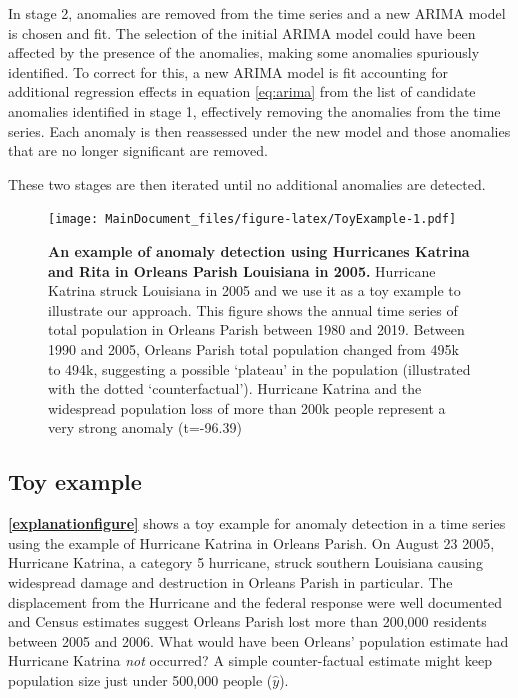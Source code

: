 \documentclass[12pt]{article}
\begin{document}
In stage 2, anomalies are removed from the time series and a new ARIMA
model is chosen and fit. The selection of the initial ARIMA model could
have been affected by the presence of the anomalies, making some
anomalies spuriously identified. To correct for this, a new ARIMA model
is fit accounting for additional regression effects in equation
\ref{eq:arima} from the list of candidate anomalies identified in stage
1, effectively removing the anomalies from the time series. Each anomaly
is then reassessed under the new model and those anomalies that are no
longer significant are removed.

These two stages are then iterated until no additional anomalies are
detected.

\begin{figure}
\centering
\texttt{[image: MainDocument\_files/figure-latex/ToyExample-1.pdf]}
\caption{\textbf{An example of anomaly detection using Hurricanes Katrina and Rita in Orleans Parish Louisiana in 2005.}
Hurricane Katrina struck Louisiana in 2005 and we use it as a toy
example to illustrate our approach. This figure shows the annual time
series of total population in Orleans Parish between 1980 and 2019.
Between 1990 and 2005, Orleans Parish total population changed from 495k
to 494k, suggesting a possible `plateau' in the population (illustrated
with the dotted `counterfactual'). Hurricane Katrina and the widespread
population loss of more than 200k people represent a very strong anomaly
(t=-96.39) \label{explanationfigure}}
\end{figure}

\hypertarget{toy-example}{%
\subsection{Toy example}\label{toy-example}}

\textbf{\autoref{explanationfigure}} shows a toy example for anomaly
detection in a time series using the example of Hurricane Katrina in
Orleans Parish. On August 23 2005, Hurricane Katrina, a category 5
hurricane, struck southern Louisiana causing widespread damage and
destruction in Orleans Parish in particular. The displacement from the
Hurricane and the federal response were well documented
\citep{horiDisplacementDynamicsSouthern2009, fussellRecoveryMigrationCity2014}
and Census estimates suggest Orleans Parish lost more than 200,000
residents between 2005 and 2006. What would have been Orleans'
population estimate had Hurricane Katrina \emph{not} occurred? A simple
counter-factual estimate might keep population size just under 500,000
people (\(\hat{y}\)).
\end{document}

